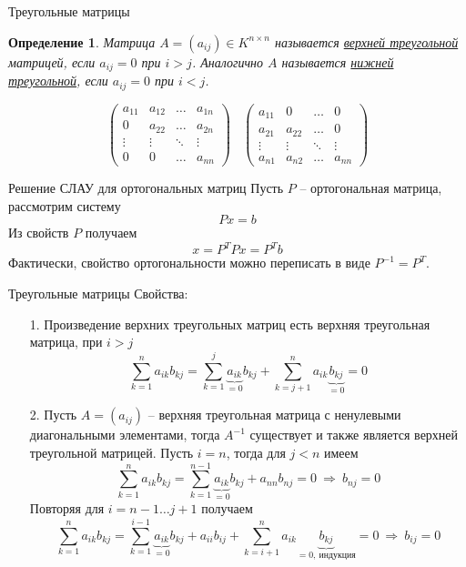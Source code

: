 \documentclass[10pt]{beamer}
\newcounter{def}
\newtheorem{definition_ru}{Определение}[def]
\begin{document}
\begin{frame}{Треугольные матрицы}
\begin{definition_ru}
Матрица $A=(a_{ij})\in K^{n\times n}$ называется \underline{верхней треугольной} матрицей, если $a_{ij}=0$ при $i > j$. Аналогично $A$ называется \underline{нижней треугольной}, если $a_{ij}=0$ при $i<j$.
\end{definition_ru}
$$
\left(\begin{array}{cccc}
a_{11} & a_{12} & \ldots & a_{1n} \\
0 & a_{22} & \ldots & a_{2n} \\
\vdots & \vdots & \ddots & \vdots \\
0 & 0 & \ldots & a_{nn}
\end{array}
\right)
~~~~\left(\begin{array}{cccc}
a_{11} & 0 & \ldots & 0 \\
a_{21} & a_{22} & \ldots & 0 \\
\vdots & \vdots & \ddots & \vdots \\
a_{n1} & a_{n2} & \ldots & a_{nn}
\end{array}
\right)
$$
\end{frame}

\begin{frame}{Решение СЛАУ для ортогональных матриц}
Пусть $P$ --  ортогональная матрица, рассмотрим систему
$$Px=b$$
\pause
Из свойств $P$ получаем
$$
x=P^TPx=P^Tb
$$
\pause
Фактически, свойство ортогональности можно переписать в виде $P^{-1}=P^T$.
\end{frame}

\begin{frame}{Треугольные матрицы}
Свойства:
\pause
\begin{itemize}[<+->]
\item[1.] Произведение верхних треугольных матриц есть верхняя треугольная матрица, при $i>j$
$$
\sum_{k=1}^na_{ik}b_{kj}=\sum_{k=1}^j\underbrace{a_{ik}}_{=0}b_{kj}+\sum_{k=j+1}^na_{ik}\underbrace{b_{kj}}_{=0}=0
$$
\item[2.] Пусть $A=(a_{ij})$ -- верхняя треугольная матрица с ненулевыми диагональными элементами, тогда $A^{-1}$ существует и также является верхней треугольной матрицей. Пусть $i=n$, тогда для $j<n$ имеем 
$$
\sum_{k=1}^na_{ik}b_{kj}=\sum_{k=1}^{n-1}\underbrace{a_{ik}}_{=0}b_{kj}+a_{nn}b_{nj}=0~\Rightarrow~b_{nj}=0
$$
Повторяя для $i=n-1\ldots j+1$ получаем
$$
\sum_{k=1}^na_{ik}b_{kj}=\sum_{k=1}^{i-1}\underbrace{a_{ik}}_{=0}b_{kj}+a_{ii}b_{ij}+\sum_{k=i+1}^{n}a_{ik}\underbrace{b_{kj}}_{=0,~\mbox{индукция}}=0~\Rightarrow~b_{ij}=0
$$

\end{itemize}
\end{frame}
\end{document}
